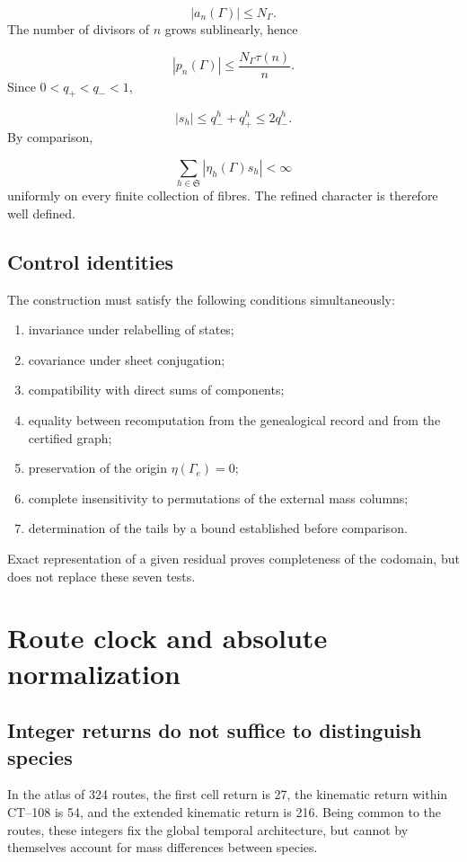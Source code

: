 \[
 |a_n(\Gamma)|\le N_\Gamma.
\]
The number of divisors of \(n\) grows sublinearly, hence

\[
 |p_n(\Gamma)|
 \le\frac{N_\Gamma\tau(n)}n.
\]
Since \(0<q_+<q_-<1\),

\[
 |s_h|\le q_-^h+q_+^h\le2q_-^h.
\]
By comparison,

\[
 \sum_{h\in\mathfrak S}|\eta_h(\Gamma)s_h|<\infty
\]
uniformly on every finite collection of fibres. The refined character is therefore well defined.

\subsection{Control identities}
The construction must satisfy the following conditions simultaneously:

\begin{enumerate}
\item invariance under relabelling of states;
\item covariance under sheet conjugation;
\item compatibility with direct sums of components;
\item equality between recomputation from the genealogical record and from the certified graph;
\item preservation of the origin \(\eta(\Gamma_e)=0\);
\item complete insensitivity to permutations of the external mass columns;
\item determination of the tails by a bound established before comparison.
\end{enumerate}
Exact representation of a given residual proves completeness of the codomain, but does not replace these seven tests.

\section{Route clock and absolute normalization}
\subsection{Integer returns do not suffice to distinguish species}
In the atlas of 324 routes, the first cell return is 27, the kinematic return within CT--108 is 54, and the extended kinematic return is 216. Being common to the routes, these integers fix the global temporal architecture, but cannot by themselves account for mass differences between species.

